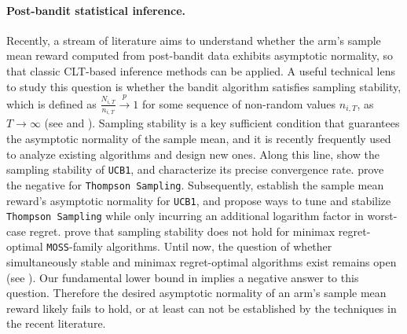 \documentclass[nonblindrev]{informs3_noinforms}
\begin{document}
\paragraph{Post-bandit statistical inference.}
Recently, a stream of literature aims to understand whether the arm's sample mean reward computed from post-bandit data exhibits asymptotic normality, so that classic CLT-based inference methods can be applied. A useful technical lens to study this question is whether the bandit algorithm satisfies sampling stability, which is defined as $\frac{N_{i,T}}{n_{i,T}}\xrightarrow{p}1$ for some sequence of non-random values $n_{i,T}$, as $T\rightarrow\infty$ (see \cite{lai1982least} and \cite{praharaj2025instability}). Sampling stability is a key sufficient condition that guarantees the asymptotic normality of the sample mean, and it is recently frequently used to analyze existing algorithms and design new ones.  Along this line, \cite{kalvit2021closer} show the sampling stability of \texttt{UCB1}, and \cite{chen2025characterization} characterize its precise convergence rate.  \cite{han2026thompson} prove the negative for \texttt{Thompson Sampling}. Subsequently, \cite{khamaru2024inference} establish the sample mean reward's asymptotic normality for \texttt{UCB1}, and \cite{halder2025stable} propose ways to tune and stabilize \texttt{Thompson Sampling} while only incurring an additional logarithm factor in worst-case regret.  \cite{praharaj2025instability} prove that sampling stability does not hold for minimax regret-optimal \texttt{MOSS}-family algorithms. Until now, the question of whether simultaneously stable and minimax regret-optimal algorithms exist remains open (see \cite{praharaj2025instability}). Our fundamental lower bound in  implies a negative answer to this question. Therefore the desired asymptotic normality of an arm's sample mean reward likely fails to hold, or at least can not be established by the techniques in the recent literature. 
\end{document}
